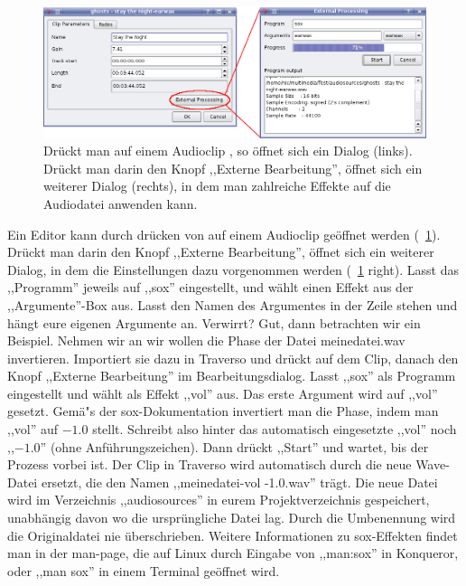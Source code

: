 \begin{figure}
	\centering
	\includegraphics[width=\textwidth]{images/external00}
	\caption{Drückt man auf einem Audioclip , so öffnet sich ein Dialog (links). Drückt man darin den Knopf ,,Externe Bearbeitung'', öffnet sich ein weiterer Dialog (rechts), in dem man zahlreiche Effekte auf die Audiodatei anwenden kann.}
	\label{fig_external01}
\end{figure}

Ein Editor kann durch drücken von  auf einem Audioclip geöffnet werden (\FigB~\ref{fig_external01}). Drückt man darin den Knopf ,,Externe Bearbeitung'', öffnet sich ein weiterer Dialog, in dem die Einstellungen dazu vorgenommen werden (\FigB~\ref{fig_external01} right). Lasst das ,,Programm'' jeweils auf ,,sox'' eingestellt, und wählt einen Effekt aus der ,,Argumente''-Box aus. Lasst den Namen des Argumentes in der Zeile stehen und hängt eure eigenen Argumente an. Verwirrt? Gut, dann betrachten wir ein Beispiel. Nehmen wir an wir wollen die Phase der Datei meinedatei.wav invertieren. Importiert sie dazu in Traverso und drückt  auf dem Clip, danach den Knopf ,,Externe Bearbeitung'' im Bearbeitungsdialog. Lasst ,,sox'' als Programm eingestellt und wählt als Effekt ,,vol'' aus. Das erste Argument wird auf ,,vol'' gesetzt. Gemä"s der sox-Dokumentation invertiert man die Phase, indem man ,,vol'' auf $-1.0$ stellt. Schreibt also hinter das automatisch eingesetzte ,,vol'' noch ,,$-1.0$'' (ohne Anführungszeichen). Dann drückt ,,Start'' und wartet, bis der Prozess vorbei ist. Der Clip in Traverso wird automatisch durch die neue Wave-Datei ersetzt, die den Namen ,,meinedatei-vol -1.0.wav'' trägt. Die neue Datei wird im Verzeichnis ,,audiosources'' in eurem Projektverzeichnis gespeichert, unabhängig davon wo die ursprüngliche Datei lag. Durch die Umbenennung wird die Originaldatei nie überschrieben. Weitere Informationen zu sox-Effekten findet man in der man-page, die auf Linux durch Eingabe von ,,man:sox'' in Konqueror, oder ,,man sox'' in einem Terminal geöffnet wird.